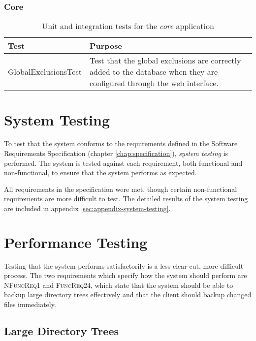 \subsubsection{Core}

\begin{table}[H]
    \centering
    \begin{tabular}{ l  p{7cm} }
        \toprule
        Test                        & Purpose
        \\ \midrule
        GlobalExclusionsTest        & Test that the global exclusions are
                                      correctly added to the database when
                                      they are configured through the web
                                      interface.
        \\ \bottomrule
    \end{tabular}
    \caption{Unit and integration tests for the \emph{core} application}
    \label{tab:tests-core}
\end{table}

\section{System Testing}

To test that the system conforms to the requirements defined in the Software
Requirements Specification (chapter \ref{chap:specification}), \emph{system
testing} is performed. The system is tested against each requirement, both
functional and non-functional, to ensure that the system performs as expected.

All requirements in the specification were met, though certain non-functional
requirements are more difficult to test. The detailed results of the system
testing are included in appendix \ref{sec:appendix-system-testing}.

\section{Performance Testing}

Testing that the system performs satisfactorily is a less clear-cut, more
difficult process. The two requirements which specify how the system should
perform are \textsc{NFuncReq1} and \textsc{FuncReq24}, which state that the
system should be able to backup large directory trees effectively and that the
client should backup changed files immediately.

\subsection{Large Directory Trees}


